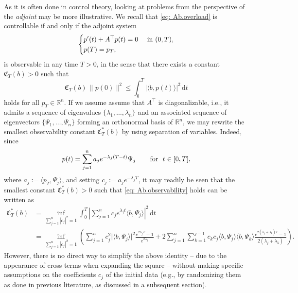 \documentclass[11pt, a4paper, reqno]{amsart}
\newcommand{\diff}{\, \mathrm{d}}
\newcommand{\R}{\mathbb{R}}
\theoremstyle{plain}
\numberwithin{equation}{section}
\begin{document}
	As it is often done in control theory, looking at problems from the perspective of the \emph{adjoint} may be more illustrative. 
	We recall that \eqref{eq: Ab.overload} is controllable if and only if the adjoint system 
	\begin{equation}
	\begin{dcases}
	p'(t) + A^\top p(t) = 0 &\text{ in } (0,T),\\
	p(T) = p_T,
	\end{dcases}
	\end{equation}
	is observable in any time $T>0$, in the sense that there exists a constant $\mathfrak{C}_T(b)>0$ such that
	\begin{equation} \label{eq: Ab.observability}
	\mathfrak{C}_T(b)\, \|p(0)\|^2 \leqslant \int_0^T \big|\langle b, p(t)\rangle\big|^2 \diff t
	\end{equation}
	holds for all $p_T\in\R^n$. 
	If we assume assume that $A^\top$ is diagonalizable, i.e., it admits a sequence of eigenvalues $\{\lambda_1,\ldots,\lambda_n\}$ and an associated sequence of eigenvectors $\{\Psi_1,\ldots,\Psi_n\}$ forming an orthonormal basis of $\R^n$, we may rewrite the smallest observability constant $\mathfrak{C}_T^*(b)$ by using separation of variables. 
	Indeed, since 
	\begin{equation*}
	p(t) = \sum_{j=1}^n a_j e^{-\lambda_j(T-t)}\Psi_j \hspace{0.5cm} \text{ for } t\in[0,T],
	\end{equation*}
	where $a_j:=\langle p_T, \Psi_j\rangle$, and setting $c_j := a_j e^{-\lambda_j T}$, it may readily be seen that the smallest constant $\mathfrak{C}^*_T(b)>0$ such that \eqref{eq: Ab.observability} holds can be written as
	\begin{align*}
	\mathfrak{C}^*_T(b) &= \inf_{\sum_{j=1}^{n}|c_j|^2=1} \int_0^T \left| \sum_{j=1}^n c_j e^{\lambda_j t}\langle b,\Psi_j\rangle \right|^2 \diff t \\
	&= \inf_{\sum_{j=1}^{n}|c_j|^2=1}\left(\sum_{j=1}^n c_j^2 \big|\langle b,\Psi_j\rangle\big|^2 \frac{e^{2\lambda_j T}-1}{e^{2\lambda_j}} + 2 \sum_{j=1}^n \sum_{k=1}^{j-1} c_k c_j  \langle b,\Psi_j\rangle \langle b,\Psi_k\rangle \frac{e^{2(\lambda_j+\lambda_k)T}-1}{2(\lambda_j+\lambda_k)}\right). 
	\end{align*}
	However, there is no direct way to simplify the above identity -- due to the appearance of cross terms when expanding the square -- without making specific assumptions on the coefficients $c_j$ of the initial data (e.g., by randomizing them as done in previous literature, as discussed in a subsequent section).  
		
\end{document}
